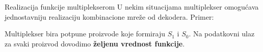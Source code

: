 \begin{frame}[t,label=03-s014]{Realizacija funkcije multiplekserom}
\setlength{\parskip}{0pt}
U nekim situacijama multiplekser omogućava jednostavniju realizaciju
kombinacione mreže od dekodera. Primer:
\par\vspace{.5mm}
\begingroup
\centering\par
\endgroup
\par\vspace{.5mm}
Multiplekser bira potpune proizvode koje formiraju \(S_1\) i \(S_0\).
Na podatkovni ulaz za svaki proizvod dovodimo \textbf{željenu vrednost funkcije}.
\end{frame}
